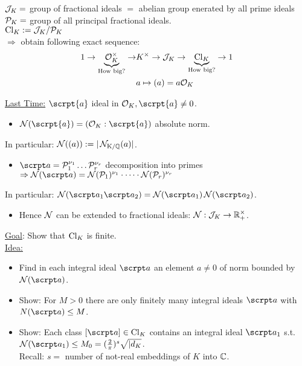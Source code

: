 
\begin{remin}
$\mathcal{J}_K =$ group of fractional ideals $=$ abelian group enerated by all prime ideals\\
$\mathcal{P}_K=$ group of all principal fractional ideals.\\
$\operatorname{Cl}_K:= \mathcal{J}_K / \mathcal{P}_K$\\
$\Rightarrow$ obtain following exact sequence:
\begin{align*}
1 \rightarrow \underbrace{\mathcal{O}_K^\times}_{\text{How big?}} \rightarrow &K^\times \rightarrow \mathcal{J}_K \rightarrow \underbrace{\operatorname{Cl}_K}_{\text{How big?}} \rightarrow 1\\
& a \mapsto (a)=a\mathcal{O}_K
\end{align*}
\end{remin}

\underline{Last Time:} $\scrpt{a}$ ideal in $\O_K, \scrpt{a} \neq 0$.
\begin{itemize}
\item $\Norm(\scrpt{a})=(\O_K : \scrpt{a})$ absolute norm.
\end{itemize}
In particular: $\operatorname{\mathcal{N}}((a)):= | \operatorname{\mathcal{N}_{K/\mathbb{Q}}}(a)|$.
\begin{itemize}
\item $\a = \mathcal{P}_{1}^{\nu_1} \dots \mathcal{P}_{r}^{\nu_r}$ decomposition into primes\\
$\Rightarrow \Norm(\a)= \Norm(\mathcal{P}_1)^{\nu_1} \cdot \dots \cdot \Norm(\mathcal{P}_r)^{\nu_r}$
\end{itemize}
In particular: $\Norm(\a_1\a_2)=\Norm(\a_1)\Norm(\a_2)$.
\begin{itemize}
\item Hence $\operatorname{\mathcal{N}}$ can be extended to fractional ideals: $\operatorname{\mathcal{N}}: \mathcal{J}_K \to \mathbb{R}^\times_+$.
\end{itemize}
\underline{Goal}: Show that $\operatorname{Cl}_K$ is finite.\\
\underline{Idea:}
\begin{itemize}
\item Find in each integral ideal $\a$ an element $a \neq 0$ of norm bounded by $\Norm(\a)$.
\item Show: For $M> 0$ there are only finitely many integral ideals $\a$ with $N(\a) \leq M$.
\item Show: Each class $[\a] \in \Cl_K$ contains an integral ideal $\a_1$ s.t. $\Norm(\a_1) \leq M_0 = (\frac{2}{\pi})^s \sqrt{|d_K}$.\\
Recall: $s=$ number of not-real embeddings of $K$ into $\mathbb{C}$.
\end{itemize}

